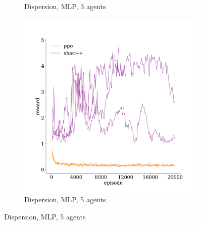 \begin{figure}[t]
\begin{subfigure}[b]{0.32\textwidth}
        \caption{Dispersion, MLP, 3 agents}
        \label{fig:dispersion-mlp-3}
    \end{subfigure}
    \begin{subfigure}[b]{0.32\textwidth}
        \includegraphics[width=\textwidth]{figs/dispersion-5-mlp.pdf}
        \caption{Dispersion, MLP, 5 agents}
        \label{fig:dispersion-mlp-5}
    \end{subfigure}


\end{figure}

